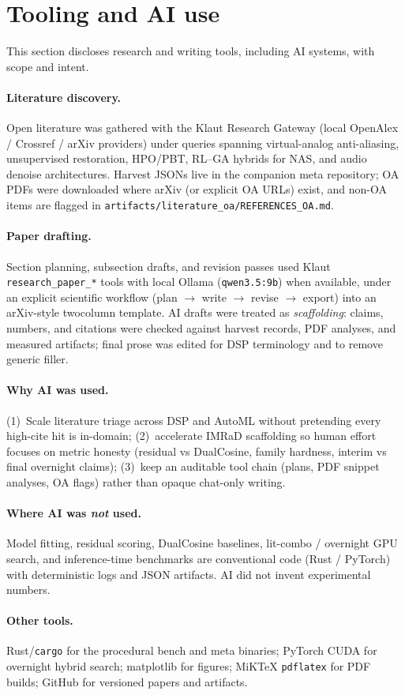 \section{Tooling and AI use}
\label{sec:tooling}

This section discloses research and writing tools, including AI systems, with
scope and intent.

\paragraph{Literature discovery.}
Open literature was gathered with the Klaut Research Gateway (local OpenAlex /
Crossref / arXiv providers) under queries spanning virtual-analog anti-aliasing,
unsupervised restoration, HPO/PBT, RL--GA hybrids for NAS, and audio denoise
architectures.
Harvest JSONs live in the companion meta repository; OA PDFs were downloaded
where arXiv (or explicit OA URLs) exist, and non-OA items are flagged in
\texttt{artifacts/literature\_oa/REFERENCES\_OA.md}.

\paragraph{Paper drafting.}
Section planning, subsection drafts, and revision passes used Klaut
\texttt{research\_paper\_*} tools with local Ollama (\texttt{qwen3.5:9b}) when
available, under an explicit scientific workflow (plan $\rightarrow$ write
$\rightarrow$ revise $\rightarrow$ export) into an arXiv-style twocolumn
template.
AI drafts were treated as \emph{scaffolding}: claims, numbers, and citations
were checked against harvest records, PDF analyses, and measured artifacts;
final prose was edited for DSP terminology and to remove generic filler.

\paragraph{Why AI was used.}
(1)~Scale literature triage across DSP and AutoML without pretending every
high-cite hit is in-domain; (2)~accelerate IMRaD scaffolding so human effort
focuses on metric honesty (residual vs DualCosine, family hardness, interim
vs final overnight claims); (3)~keep an auditable tool chain (plans, PDF
snippet analyses, OA flags) rather than opaque chat-only writing.

\paragraph{Where AI was \emph{not} used.}
Model fitting, residual scoring, DualCosine baselines, lit-combo / overnight
GPU search, and inference-time benchmarks are conventional code (Rust / PyTorch)
with deterministic logs and JSON artifacts.
AI did not invent experimental numbers.

\paragraph{Other tools.}
Rust/\texttt{cargo} for the procedural bench and meta binaries; PyTorch CUDA
for overnight hybrid search; matplotlib for figures; MiKTeX \texttt{pdflatex}
for PDF builds; GitHub for versioned papers and artifacts.
